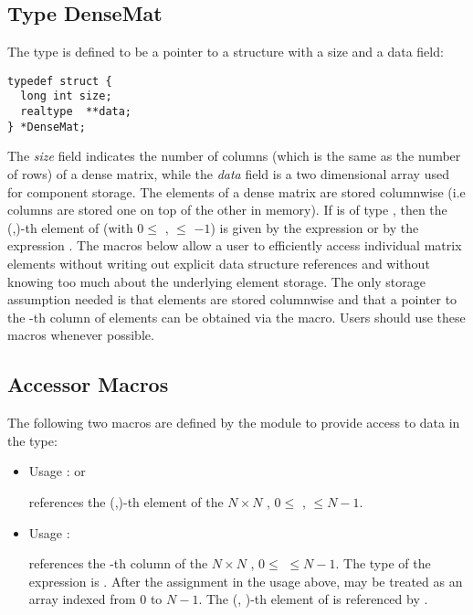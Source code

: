\subsection{Type DenseMat}
The type  is defined to be a pointer to a structure    
with a size and a data field:
\begin{verbatim}
typedef struct {
  long int size;
  realtype  **data;
} *DenseMat;
\end{verbatim}
The {\em size} field indicates the number of columns (which is the same as the
number of rows) of a dense matrix, while the {\em data} field is a two 
dimensional array used for component storage. 
The elements of a dense matrix are stored columnwise (i.e columns are stored 
one on top of the other in memory). If  is of type , 
then the (,)-th element of  
(with $0 \le$ ,  $\le$ $-1$) 
is given by the expression  
or by the expression . The macros below     
allow a user to efficiently access individual matrix           
elements without writing out explicit data structure           
references and without knowing too much about the underlying   
element storage. The only storage assumption needed is that    
elements are stored columnwise and that a pointer to the -th   
column of elements can be obtained via the  macro.    
Users should use these macros whenever possible.               

\subsection{Accessor Macros}
The following two macros are defined by the {\dense} module to provide
access to data in the  type:
\begin{itemize}
\item {}
  \par Usage :  or
  \par {} references the (,)-th element of the $N \times N$
   , $0 \le$ ,  $\le N-1$.
  
\item {}
  \par Usage : 
  \par {} references the -th column of the $N \times N$
   , $0 \le$  $\le N-1$. The type of the expression          
   is  . After the assignment in the usage    
  above,  may be treated as an array indexed from $0$ to $N-1$. 
  The (, )-th element of  is referenced by .  
\end{itemize}

